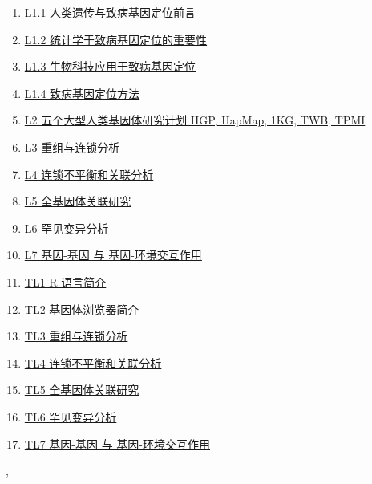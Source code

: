 \documentclass[11pt]{article}
\renewcommand{\today}{\shortmonthname[\the\month] \the \day,  \the\year}
\begin{document}
\begin{enumerate}
	\item \href{https://mp.weixin.qq.com/s/dYcAOszbxjkXfWBozW-W0w}{L1.1 人类遗传与致病基因定位前言}	%
	\item \href{https://mp.weixin.qq.com/s/njpXXiN_ikv76wBcbSN-3w}{L1.2 统计学于致病基因定位的重要性}	%
	\item \href{https://mp.weixin.qq.com/s/nUD-p3Zxsa_C5xfm16kn1g}{L1.3 生物科技应用于致病基因定位}	%
	\item \href{https://mp.weixin.qq.com/s/ByqMU0odODDRl_DY-qZ7Cw}{L1.4 致病基因定位方法}	%
	\item \href{https://mp.weixin.qq.com/s/9oFLikXU1yKPyuOyiz36dQ}{L2 五个大型人类基因体研究计划 HGP, HapMap, 1KG, TWB, TPMI}	%
	\item \href{https://mp.weixin.qq.com/s/LvggdrSGB-Ofg86Xxjl09w}{L3 重组与连锁分析}	%
	\item \href{https://mp.weixin.qq.com/s/l4CuuMBEb_P7iotA0A1XqA}{L4 连锁不平衡和关联分析}	%
	\item \href{https://mp.weixin.qq.com/s/P_EFJadyD8HLosid_oTM_A}{L5 全基因体关联研究}	%
	\item \href{https://mp.weixin.qq.com/s/qrlOIkPn-_pFpMnwUePREQ}{L6 罕见变异分析}	%
	\item \href{https://mp.weixin.qq.com/s/u7KM8hDEGcDQUvYeJmki4w}{L7 基因-基因 与 基因-环境交互作用}	%
	\item \href{https://mp.weixin.qq.com/s/hal8raeoaigCFaVRYPJZdA}{TL1 R 语言简介}	%
	\item \href{https://mp.weixin.qq.com/s/p8R-8IIwnPCuZXQKOm53Og}{TL2 基因体浏览器简介}	%
	\item \href{https://mp.weixin.qq.com/s/Ys06dgKTUVFt3hoMnUgZuw}{TL3 重组与连锁分析}	%
	\item \href{https://mp.weixin.qq.com/s/lOEiVy4XCUBJHkgPbMWsCA}{TL4 连锁不平衡和关联分析}	%
	\item \href{https://mp.weixin.qq.com/s/f6ahkeqV8uE9sE_Zl2eHWQ}{TL5 全基因体关联研究}	%
	\item \href{https://mp.weixin.qq.com/s/yrXnqIntWyF3THQnr0-i-g}{TL6 罕见变异分析}	%
	\item \href{https://mp.weixin.qq.com/s/7I3e2Y4J1kqofT9P4Qgydw}{TL7 基因-基因 与 基因-环境交互作用}	%
\end{enumerate}



%
\begin{flushright}
	\tiny \today 
\end{flushright}
\end{document}
